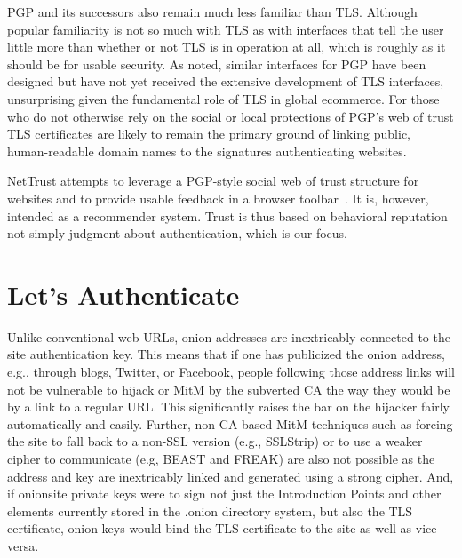 \documentclass[10pt, conference, compsocconf]{styles/IEEEtran}
\begin{document}
PGP and its successors also remain much less familiar than
TLS. Although popular familiarity is not so much with TLS as with
interfaces that tell the user little more than whether or not TLS is
in operation at all, which is roughly as it should be for usable
security. As noted, similar interfaces for PGP have been designed but
have not yet received the extensive development of TLS interfaces,
unsurprising given the fundamental role of TLS in global ecommerce.
For those who do not otherwise rely on the social or local protections
of PGP's web of trust TLS certificates are likely to remain the
primary ground of linking public, human-readable domain names to the
signatures authenticating websites.

NetTrust attempts to leverage a PGP-style social web of trust
structure for websites and to provide usable feedback in a browser
toolbar~\cite{nettrust}. It is, however, intended as a recommender
system. Trust is thus based on behavioral reputation not
simply judgment about authentication, which is our focus.


\section{Let's Authenticate}
\label{lets-auth}


Unlike conventional web URLs, onion addresses are inextricably
connected to the site authentication key. This means that if one has
publicized the onion address, e.g., through blogs, Twitter, or
Facebook, people following those address links will not be vulnerable
to hijack or MitM by the subverted CA the way they would be by a link
to a regular URL\@. This significantly raises the bar on the hijacker
fairly automatically and easily. Further, non-CA-based MitM techniques
such as forcing the site to fall back to a non-SSL version (e.g.,
SSLStrip) or to use a weaker cipher to communicate (e.g, BEAST and
FREAK) are also not possible as the address and key are inextricably
linked and generated using a strong cipher. And, if onionsite private
keys were to sign not just the Introduction Points and other elements
currently stored in the .onion directory system, but also the TLS
certificate, onion keys would bind the TLS certificate to the site as
well as vice versa. 
\end{document}
